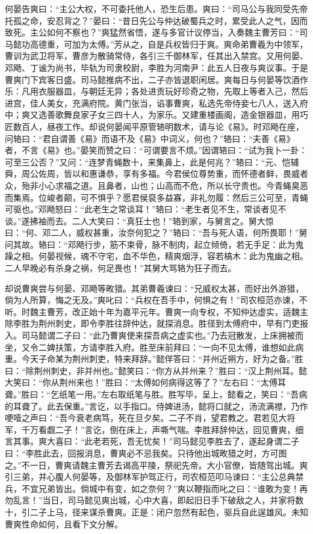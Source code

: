 何晏告爽曰：“主公大权，不可委托他人，恐生后患。爽曰：“司马公与我同受先帝托孤之命，安忍背之？”晏曰：“昔日先公与仲达破蜀兵之时，累受此人之气，因而致死。主公如何不察也？”爽猛然省悟，遂与多官计议停当，入奏魏主曹芳曰：“司马懿功高德重，可加为太傅。”芳从之，自是兵权皆归于爽。爽命弟曹羲为中领军，曹训为武卫将军，曹彦为散骑常侍，各引三千御林军，任其出入禁宫。又用何晏、邓飏、丁谧为尚书，毕轨为司隶校尉，李胜为河南尹：此五人日夜与爽议事。于是曹爽门下宾客日盛。司马懿推病不出，二子亦皆退职闲居。爽每日与何晏等饮酒作乐：凡用衣服器皿，与朝廷无异；各处进贡玩好珍奇之物，先取上等者入己，然后进宫，佳人美女，充满府院。黄门张当，谄事曹爽，私选先帝侍妾七八人，送入府中；爽又选善歌舞良家子女三四十人，为家乐。又建重楼画阁，造金银器皿，用巧匠数百人，昼夜工作。却说何晏闻平原管辂明数术，请与论《易》。时邓飏在座，问辂曰：“君自谓善《易》而语不及《易》中词义，何也？”辂曰：“夫善《易》者，不言《易》也。”晏笑而赞之曰：“可谓要言不烦。”因谓辂曰：“试为我卜一卦：可至三公否？”又问：“连梦青蝇数十，来集鼻上，此是何兆？”辂曰：“元、恺辅舜，周公佐周，皆以和惠谦恭，享有多福。今君侯位尊势重，而怀德者鲜，畏威者众，殆非小心求福之道。且鼻者，山也；山高而不危，所以长守贵也。今青蝇臭恶而集焉。位峻者颠，可不惧乎？愿君侯裒多益寡，非礼勿履：然后三公可至，青蝇可驱也。”邓飏怒曰：“此老生之常谈耳！”辂曰：“老生者见不生，常谈者见不谈。”遂拂袖而去。二人大笑曰：“真狂士也！”辂到家，与舅言之。舅大惊曰：“何、邓二人，威权甚重，汝奈何犯之？”辂曰：“吾与死人语，何所畏耶！”舅问其故。辂曰：“邓飏行步，筋不束骨，脉不制肉，起立倾倚，若无手足：此为鬼躁之相。何晏视候，魂不守宅，血不华色，精爽烟浮，容若槁木：此为鬼幽之相。二人早晚必有杀身之祸，何足畏也！”其舅大骂辂为狂子而去。

却说曹爽尝与何晏、邓飏等畋猎。其弟曹羲谏曰：“兄威权太甚，而好出外游猎，倘为人所算，悔之无及。”爽叱曰：“兵权在吾手中，何惧之有！”司农桓范亦谏，不听。时魏主曹芳，改正始十年为嘉平元年。曹爽一向专权，不知仲达虚实，适魏主除李胜为荆州刺史，即令李胜往辞仲达，就探消息。胜径到太傅府中，早有门吏报入。司马懿谓二子曰：“此乃曹爽使来探吾病之虚实也。”乃去冠散发，上床拥被而坐，又令二婢扶策，方请李胜入府。胜至床前拜曰：“一向不见太傅，谁想如此病重。今天子命某为荆州刺吏，特来拜辞。”懿佯答曰：“并州近朔方，好为之备。”胜曰：“除荆州刺史，非并州也。”懿笑曰：“你方从并州来？”胜曰：“汉上荆州耳。懿大笑曰：“你从荆州来也！”胜曰：“太傅如何病得这等了？”左右曰：“太傅耳聋。”胜曰：“乞纸笔一用。”左右取纸笔与胜。胜写毕，呈上，懿看之，笑曰：“吾病的耳聋了。此去保重。”言讫，以手指口。侍婢进汤，懿将口就之，汤流满襟，乃作哽噎之声曰：“吾今衰老病笃，死在旦夕矣。二子不肖，望君教之。君若见大将军，千万看觑二子！”言讫，倒在床上，声嘶气喘。李胜拜辞仲达，回见曹爽，细言其事。爽大喜曰：“此老若死，吾无忧矣！”司马懿见李胜去了，遂起身谓二子曰：“李胜此去，回报消息，曹爽必不忌我矣。只待他出城畋猎之时，方可图之。”不一日，曹爽请魏主曹芳去谒高平陵，祭祀先帝。大小官僚，皆随驾出城。爽引三弟，并心腹人何晏等，及御林军护驾正行，司农桓范叩马谏曰：“主公总典禁兵，不宜兄弟皆出。倘城中有变，如之奈何？”爽以鞭指而叱之曰：“谁敢为变！再勿乱言！”当日，司马懿见爽出城，心中大喜，即起旧日手下破敌之人，并家将数十，引二子上马，径来谋杀曹爽。正是：闭户忽然有起色，驱兵自此逞雄风。未知曹爽性命如何，且看下文分解。
